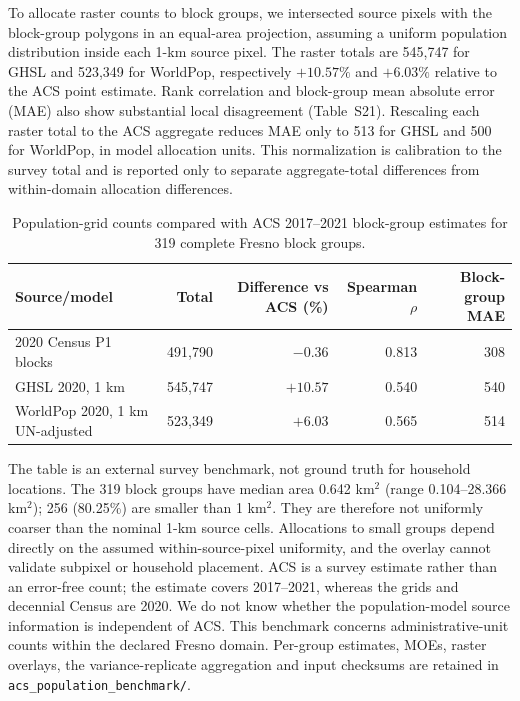 \documentclass[10pt,a4paper]{article}
\begin{document}
To allocate raster counts to block groups, we intersected source pixels with the block-group polygons in an equal-area projection, assuming a uniform population distribution inside each 1-km source pixel. The raster totals are 545,747 for GHSL and 523,349 for WorldPop, respectively $+10.57\%$ and $+6.03\%$ relative to the ACS point estimate. Rank correlation and block-group mean absolute error (MAE) also show substantial local disagreement (Table~S21). Rescaling each raster total to the ACS aggregate reduces MAE only to 513 for GHSL and 500 for WorldPop, in model allocation units. This normalization is calibration to the survey total and is reported only to separate aggregate-total differences from within-domain allocation differences.

\begin{table}[htbp]\centering\small
\caption{Population-grid counts compared with ACS 2017--2021 block-group estimates for 319 complete Fresno block groups.}
\begin{tabular}{lrrrr}\toprule
Source/model & Total & Difference vs ACS (\%) & Spearman $\rho$ & Block-group MAE \\\midrule
2020 Census P1 blocks & 491,790 & $-0.36$ & 0.813 & 308 \\
GHSL 2020, 1 km & 545,747 & $+10.57$ & 0.540 & 540 \\
WorldPop 2020, 1 km UN-adjusted & 523,349 & $+6.03$ & 0.565 & 514 \\
\bottomrule\end{tabular}
\end{table}

The table is an external survey benchmark, not ground truth for household locations. The 319 block groups have median area 0.642 km$^2$ (range 0.104--28.366 km$^2$); 256 (80.25\%) are smaller than 1 km$^2$. They are therefore not uniformly coarser than the nominal 1-km source cells. Allocations to small groups depend directly on the assumed within-source-pixel uniformity, and the overlay cannot validate subpixel or household placement. ACS is a survey estimate rather than an error-free count; the estimate covers 2017--2021, whereas the grids and decennial Census are 2020. We do not know whether the population-model source information is independent of ACS. This benchmark concerns administrative-unit counts within the declared Fresno domain. Per-group estimates, MOEs, raster overlays, the variance-replicate aggregation and input checksums are retained in \texttt{acs\_population\_benchmark/}.
\end{document}
